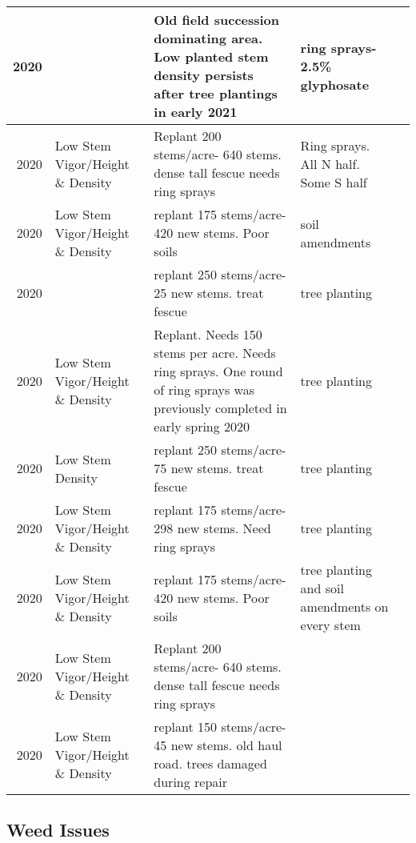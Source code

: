 \documentclass[
  landscape]{article}
\begin{document}
\begin{tabular}{r|l|l|l|l}
\hline
2020 &  & Old field succession dominating area. Low planted stem density persists after tree plantings in early 2021 & ring sprays- 2.5\% glyphosate & \\
\hline
2020 & Low Stem Vigor/Height \& Density & Replant 200 stems/acre- 640 stems. dense tall fescue needs ring sprays & Ring sprays. All N half. Some S half & \\
\hline
2020 & Low Stem Vigor/Height \& Density & replant 175 stems/acre- 420 new stems. Poor soils & soil amendments & \\
\hline
2020 &  & replant 250 stems/acre- 25 new stems. treat fescue & tree planting & \\
\hline
2020 & Low Stem Vigor/Height \& Density & Replant. Needs 150 stems per acre. Needs ring sprays. One round of ring sprays was previously completed in early spring 2020 & tree planting & \\
\hline
2020 & Low Stem Density & replant 250 stems/acre- 75 new stems. treat fescue & tree planting & \\
\hline
2020 & Low Stem Vigor/Height \& Density & replant 175 stems/acre- 298 new stems. Need ring sprays & tree planting & \\
\hline
2020 & Low Stem Vigor/Height \& Density & replant 175 stems/acre- 420 new stems. Poor soils & tree planting and soil amendments on every stem & \\
\hline
2020 & Low Stem Vigor/Height \& Density & Replant 200 stems/acre- 640 stems. dense tall fescue needs ring sprays &  & \\
\hline
2020 & Low Stem Vigor/Height \& Density & replant 150 stems/acre- 45 new stems. old haul road. trees damaged during repair &  & \\
\hline
\end{tabular}

\hypertarget{weed-issues}{%
\subsection{Weed Issues}\label{weed-issues}}
\end{document}
